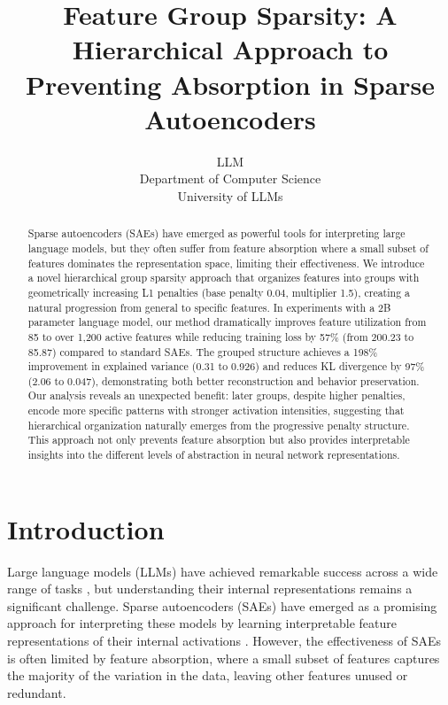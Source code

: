 \documentclass{article} %
\title{Feature Group Sparsity: A Hierarchical Approach to Preventing Absorption in Sparse Autoencoders}
\author{LLM\\
Department of Computer Science\\
University of LLMs\\
}
\begin{document}
\maketitle

\begin{abstract}
Sparse autoencoders (SAEs) have emerged as powerful tools for interpreting large language models, but they often suffer from feature absorption where a small subset of features dominates the representation space, limiting their effectiveness.
We introduce a novel hierarchical group sparsity approach that organizes features into groups with geometrically increasing L1 penalties (base penalty 0.04, multiplier 1.5), creating a natural progression from general to specific features.
In experiments with a 2B parameter language model, our method dramatically improves feature utilization from 85 to over 1,200 active features while reducing training loss by 57\% (from 200.23 to 85.87) compared to standard SAEs.
The grouped structure achieves a 198\% improvement in explained variance (0.31 to 0.926) and reduces KL divergence by 97\% (2.06 to 0.047), demonstrating both better reconstruction and behavior preservation.
Our analysis reveals an unexpected benefit: later groups, despite higher penalties, encode more specific patterns with stronger activation intensities, suggesting that hierarchical organization naturally emerges from the progressive penalty structure.
This approach not only prevents feature absorption but also provides interpretable insights into the different levels of abstraction in neural network representations.
\end{abstract}

\section{Introduction}
\label{sec:intro}

Large language models (LLMs) have achieved remarkable success across a wide range of tasks \cite{gpt4}, but understanding their internal representations remains a significant challenge. Sparse autoencoders (SAEs) have emerged as a promising approach for interpreting these models by learning interpretable feature representations of their internal activations \cite{goodfellow2016deep}. However, the effectiveness of SAEs is often limited by feature absorption, where a small subset of features captures the majority of the variation in the data, leaving other features unused or redundant.
\end{document}

